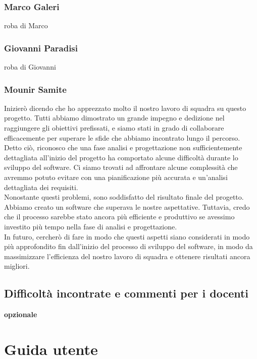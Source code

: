 \documentclass[a4paper,12pt]{report}
\begin{document}
\subsection*{Marco Galeri}
roba di Marco
\subsection*{Giovanni Paradisi}
roba di Giovanni
\subsection*{Mounir Samite}
Inizierò dicendo che ho apprezzato molto il nostro lavoro di squadra su questo progetto. Tutti abbiamo dimostrato un grande impegno e dedizione nel raggiungere gli obiettivi prefissati, e siamo stati in grado di collaborare efficacemente per superare le sfide che abbiamo incontrato lungo il percorso.
\\
Detto ciò, riconosco che una fase analisi e progettazione non sufficientemente dettagliata all'inizio del progetto ha comportato alcune difficoltà durante lo sviluppo del software. Ci siamo trovati ad affrontare alcune complessità che avremmo potuto evitare con una pianificazione più accurata e un'analisi dettagliata dei requisiti.
\\
Nonostante questi problemi, sono soddisfatto del risultato finale del progetto. Abbiamo creato un software che superava le nostre aspettative. Tuttavia, credo che il processo sarebbe stato ancora più efficiente e produttivo se avessimo investito più tempo nella fase di analisi e progettazione.
\\
In futuro, cercherò di fare in modo che questi aspetti siano considerati in modo più approfondito fin dall'inizio del processo di sviluppo del software, in modo da massimizzare l'efficienza del nostro lavoro di squadra e ottenere risultati ancora migliori.
\section{Difficoltà incontrate e commenti per i docenti}

\textbf{opzionale}



\appendix


\chapter{Guida utente}
\end{document}
